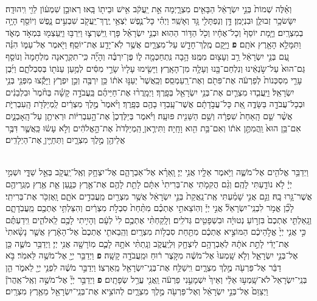 \documentclass[twoside, openany, parskip=half, 11pt]{book}
\begin{document}
\begin{footnotesize}
\begin{multicols}{2}
\\
 וְאֵ֗לֶּה שְׁמוֹת֙ בְּנֵ֣י יִשְׂרָאֵ֔ל הַבָּאִ֖ים מִצְרָ֑יְמָה אֵ֣ת יַֽעֲקֹ֔ב אִ֥ישׁ וּבֵית֖וֹ בָּֽאוּ׃ רְאוּבֵ֣ן שִׁמְע֔וֹן לֵוִ֖י וִֽיהוּדָֽה׃ יִשָּׂשׂכָ֥ר זְבוּלֻ֖ן וּבִנְיָמִֽן׃ דָּ֥ן וְנַפְתָּלִ֖י גָּ֥ד וְאָשֵֽׁר׃ וַיְהִ֗י כָּל־נֶ֛פֶשׁ יֹֽצְאֵ֥י יֶֽרֶךְ־יַֽעֲקֹ֖ב שִׁבְעִ֣ים נָ֑פֶשׁ וְיוֹסֵ֖ף הָיָ֥ה בְמִצְרָֽיִם׃ וַיָּ֤מָת יוֹסֵף֙ וְכָל־אֶחָ֔יו וְכֹ֖ל הַדּ֥וֹר הַהֽוּא׃ וּבְנֵ֣י יִשְׂרָאֵ֗ל פָּר֧וּ וַֽיִּשְׁרְצ֛וּ וַיִּרְבּ֥וּ וַיַּֽעַצְמ֖וּ בִּמְאֹ֣ד מְאֹ֑ד וַתִּמָּלֵ֥א הָאָ֖רֶץ אֹתָֽם׃ \textbf{פ} 
וַיָּ֥קָם מֶֽלֶךְ־חָדָ֖שׁ עַל־מִצְרָ֑יִם אֲשֶׁ֥ר לֹֽא־יָדַ֖ע אֶת־יוֹסֵֽף׃ וַיֹּ֖אמֶר אֶל־עַמּ֑וֹ הִנֵּ֗ה עַ֚ם בְּנֵ֣י יִשְׂרָאֵ֔ל רַ֥ב וְעָצ֖וּם מִמֶּֽנּוּ׃ הָ֥בָה נִּֽתְחַכְּמָ֖ה ל֑וֹ פֶּן־יִרְבֶּ֗ה וְהָיָ֞ה כִּֽי־תִקְרֶ֤אנָה מִלְחָמָה֙ וְנוֹסַ֤ף גַּם־הוּא֙ עַל־שֹׂ֣נְאֵ֔ינוּ וְנִלְחַם־בָּ֖נוּ וְעָלָ֥ה מִן־הָאָֽרֶץ׃ וַיָּשִׂ֤ימוּ עָלָיו֙ שָׂרֵ֣י מִסִּ֔ים לְמַ֥עַן עַנֹּת֖וֹ בְּסִבְלֹתָ֑ם וַיִּ֜בֶן עָרֵ֤י מִסְכְּנוֹת֙ לְפַרְעֹ֔ה אֶת־פִּתֹ֖ם וְאֶת־רַֽעַמְסֵֽס׃ וְכַֽאֲשֶׁר֙ יְעַנּ֣וּ אֹת֔וֹ כֵּ֥ן יִרְבֶּ֖ה וְכֵ֣ן יִפְרֹ֑ץ וַיָּקֻ֕צוּ מִפְּנֵ֖י בְּנֵ֥י יִשְׂרָאֵֽל׃  וַיַּֽעֲבִ֧דוּ מִצְרַ֛יִם אֶת־בְּנֵ֥י יִשְׂרָאֵ֖ל בְּפָֽרֶךְ׃ וַיְמָֽרֲר֨וּ אֶת־חַיֵּיהֶ֜ם בַּֽעֲבֹדָ֣ה קָשָׁ֗ה בְּחֹ֨מֶר֙ וּבִלְבֵנִ֔ים וּבְכָל־עֲבֹדָ֖ה בַּשָּׂדֶ֑ה אֵ֚ת כָּל־עֲבֹ֣דָתָ֔ם אֲשֶׁר־עָֽבְד֥וּ בָהֶ֖ם בְּפָֽרֶךְ׃ וַיֹּ֨אמֶר֙ מֶ֣לֶךְ מִצְרַ֔יִם לַֽמְיַלְּדֹ֖ת הָֽעִבְרִיֹּ֑ת אֲשֶׁ֨ר שֵׁ֤ם הָֽאַחַת֙ שִׁפְרָ֔ה וְשֵׁ֥ם הַשֵּׁנִ֖ית פּוּעָֽה׃ וַיֹּ֗אמֶר בְּיַלֶּדְכֶן֙ אֶת־הָ֣עִבְרִיּ֔וֹת וּרְאִיתֶ֖ן עַל־הָֽאָבְנָ֑יִם אִם־בֵּ֥ן הוּא֙ וַֽהֲמִתֶּ֣ן אֹת֔וֹ וְאִם־בַּ֥ת הִ֖וא וָחָֽיָה׃ וַתִּירֶ֤אןָ הַֽמְיַלְּדֹת֙ אֶת־הָ֣אֱלֹהִ֔ים וְלֹ֣א עָשׂ֔וּ כַּֽאֲשֶׁ֛ר דִּבֶּ֥ר אֲלֵיהֶ֖ן מֶ֣לֶךְ מִצְרָ֑יִם וַתְּחַיֶּ֖יןָ אֶת־הַיְלָדִֽים׃

\\
 וַיְדַבֵּ֥ר אֱלֹהִ֖ים אֶל־מֹשֶׁ֑ה וַיֹּ֥אמֶר אֵלָ֖יו אֲנִ֥י יְיָ׃ וָֽאֵרָ֗א אֶל־אַבְרָהָ֛ם אֶל־יִצְחָ֥ק וְאֶֽל־יַֽעֲקֹ֖ב בְּאֵ֣ל שַׁדָּ֑י וּשְׁמִ֣י יְיָ֔ לֹ֥א נוֹדַ֖עְתִּי לָהֶֽם׃ וְגַ֨ם הֲקִמֹ֤תִי אֶת־בְּרִיתִי֙ אִתָּ֔ם לָתֵ֥ת לָהֶ֖ם אֶת־אֶ֣רֶץ כְּנָ֑עַן אֵ֛ת אֶ֥רֶץ מְגֻֽרֵיהֶ֖ם אֲשֶׁר־גָּ֥רוּ בָֽהּ׃ וְגַ֣ם אֲנִ֣י שָׁמַ֗עְתִּי אֶֽת־נַֽאֲקַת֙ בְּנֵ֣י יִשְׂרָאֵ֔ל אֲשֶׁ֥ר מִצְרַ֖יִם מַֽעֲבִדִ֣ים אֹתָ֑ם וָֽאֶזְכֹּ֖ר אֶת־בְּרִיתִֽי׃  לָכֵ֞ן אֱמֹ֥ר לִבְנֵֽי־יִשְׂרָאֵל֘ אֲנִ֣י יְיָ֒ וְהֽוֹצֵאתִ֣י אֶתְכֶ֗ם מִתַּ֨חַת֙ סִבְלֹ֣ת מִצְרַ֔יִם וְהִצַּלְתִּ֥י אֶתְכֶ֖ם מֵֽעֲבֹֽדָתָ֑ם וְגָֽאַלְתִּ֤י אֶתְכֶם֙ בִּזְר֣וֹעַ נְטוּיָ֔ה וּבִשְׁפָטִ֖ים גְּדֹלִֽים׃ וְלָֽקַחְתִּ֨י אֶתְכֶ֥ם לִי֙ לְעָ֔ם וְהָיִ֥יתִי לָכֶ֖ם לֵֽאלֹהִ֑ים וִֽידַעְתֶּ֗ם כִּ֣י אֲנִ֤י יְיָ֙ אֱלֹ֣הֵיכֶ֔ם הַמּוֹצִ֣יא אֶתְכֶ֔ם מִתַּ֖חַת סִבְל֥וֹת מִצְרָֽיִם׃ וְהֵֽבֵאתִ֤י אֶתְכֶם֙ אֶל־הָאָ֔רֶץ אֲשֶׁ֤ר נָשָׂ֨אתִי֙ אֶת־יָדִ֔י לָתֵ֣ת אֹתָ֔הּ לְאַבְרָהָ֥ם לְיִצְחָ֖ק וּֽלְיַֽעֲקֹ֑ב וְנָֽתַתִּ֨י אֹתָ֥הּ לָכֶ֛ם מֽוֹרָשָׁ֖ה אֲנִ֥י יְיָ׃ וַיְדַבֵּ֥ר מֹשֶׁ֛ה כֵּ֖ן אֶל־בְּנֵ֣י יִשְׂרָאֵ֑ל וְלֹ֤א שָֽׁמְעוּ֙ אֶל־מֹשֶׁ֔ה מִקֹּ֣צֶר ר֔וּחַ וּמֵֽעֲבֹדָ֖ה קָשָֽׁה׃ \textbf{פ} 
 וַיְדַבֵּ֥ר יְיָ֖ אֶל־מֹשֶׁ֥ה לֵּאמֹֽר׃ בֹּ֣א דַבֵּ֔ר אֶל־פַּרְעֹ֖ה מֶ֣לֶךְ מִצְרָ֑יִם וִֽישַׁלַּ֥ח אֶת־בְּנֵֽי־יִשְׂרָאֵ֖ל מֵֽאַרְצֽוֹ׃ וַיְדַבֵּ֣ר מֹשֶׁ֔ה לִפְנֵ֥י יְיָ֖ לֵאמֹ֑ר הֵ֤ן בְּנֵֽי־יִשְׂרָאֵל֙ לֹא־שָֽׁמְע֣וּ אֵלַ֔י וְאֵיךְ֙ יִשְׁמָעֵ֣נִי פַרְעֹ֔ה וַֽאֲנִ֖י עֲרַ֥ל שְׂפָתָֽיִם׃ \textbf{פ} 
וַיְדַבֵּ֣ר יְיָ֘ אֶל־מֹשֶׁ֣ה וְאֶֽל־אַֽהֲרֹן֒ וַיְצַוֵּם֙ אֶל־בְּנֵ֣י יִשְׂרָאֵ֔ל וְאֶל־פַּרְעֹ֖ה מֶ֣לֶךְ מִצְרָ֑יִם לְהוֹצִ֥יא אֶת־בְּנֵֽי־יִשְׂרָאֵ֖ל מֵאֶ֥רֶץ מִצְרָֽיִם׃


\end{multicols}
\end{footnotesize}
\end{document}
